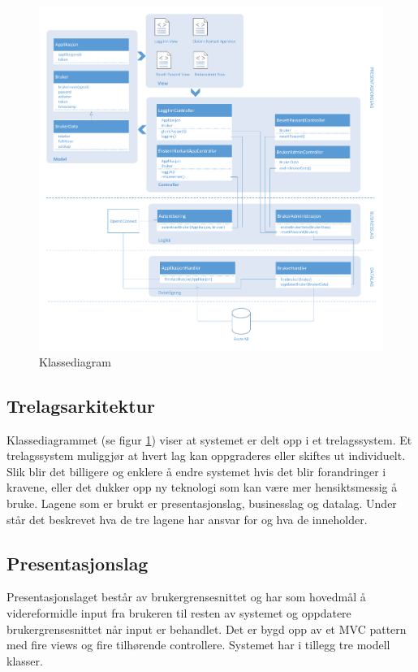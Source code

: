 \begin{figure}[H]
    \centering
    \includegraphics[scale=0.45]{graphics/04-arkitektur/LogiskViewKlassediagram}
    \caption{Klassediagram}
    \label{fig:LogiskViewKlassediagram}
\end{figure}

\subsection*{Trelagsarkitektur}
\label{subsec:logisk_view_trelagsarkitektur}
Klassediagrammet (se figur \ref{fig:LogiskViewKlassediagram}) viser at systemet er delt opp i et trelagssystem. Et trelagssystem muliggjør at hvert lag kan oppgraderes eller skiftes ut individuelt. Slik blir det billigere og enklere å endre systemet hvis det blir forandringer i kravene, eller det dukker opp ny teknologi som kan være mer hensiktsmessig å bruke. Lagene som er brukt er presentasjonslag, businesslag og datalag. Under står det beskrevet hva de tre lagene har ansvar for og hva de inneholder.
\newline
\subsection{Presentasjonslag}
\label{subsec:logisk_view_presentasjonslag}
Presentasjonslaget består av brukergrensesnittet og har som hovedmål å videreformidle input fra brukeren til resten av systemet og oppdatere brukergrensesnittet når input er behandlet. Det er bygd opp av et MVC pattern med fire views og fire tilhørende controllere. Systemet har i tillegg tre modell klasser.
\newline

